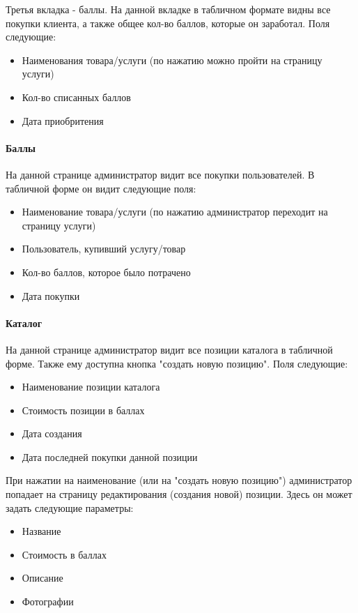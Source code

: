 \documentclass[DIV=calc, paper=a4, fontsize=11pt]{scrartcl} %
\begin{document}
Третья вкладка - баллы. На данной вкладке в табличном формате видны все покупки клиента, а также общее кол-во баллов, которые он заработал. Поля следующие:

\begin{itemize}
	\item Наименования товара/услуги (по нажатию можно пройти на страницу услуги)
	\item Кол-во списанных баллов
	\item Дата приобритения
\end{itemize}

\paragraph{Баллы}

На данной странице администратор видит все покупки пользователей. В табличной форме он видит следующие поля:

\begin{itemize}
	\item Наименование товара/услуги (по нажатию администратор переходит на страницу услуги)
	\item Пользователь, купивший услугу/товар
	\item Кол-во баллов, которое было потрачено
	\item Дата покупки
\end{itemize}

\paragraph{Каталог}

На данной странице администратор видит все позиции каталога в табличной форме. Также ему доступна кнопка "создать новую позицию". Поля следующие:

\begin{itemize}
	\item Наименование позиции каталога
	\item Стоимость позиции в баллах
	\item Дата создания
	\item Дата последней покупки данной позиции
\end{itemize}

При нажатии на наименование (или на "создать новую позицию") администратор попадает на страницу редактирования (создания новой) позиции. Здесь он может задать следующие параметры:

\begin{itemize}
	\item Название
	\item Стоимость в баллах
	\item Описание
	\item Фотографии
\end{itemize}
\end{document}
